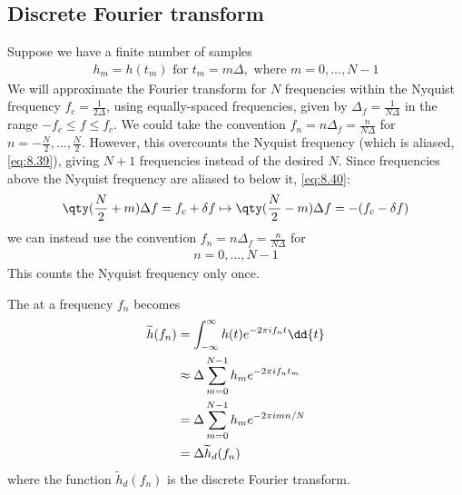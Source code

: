 \subsection{Discrete Fourier transform}
Suppose we have a finite number of samples
\begin{align} \label{eq:8.45}
	h_m = h(t_m) \text{ for } t_m = m \Delta, \text{ where } m = 0,\dots, N-1
\end{align}
We will approximate the Fourier transform for $N$ frequencies within the Nyquist frequency $f_c = \frac{1}{2\Delta}$, using equally-spaced frequencies, given by $\Delta_f = \frac{1}{N\Delta}$ in the range $-f_c \leq f \leq f_c$.
We could take the convention $f_n = n \Delta_f = \frac{n}{N\Delta}$ for $n = -\frac{N}{2}, \dots, \frac{N}{2}$.
However, this overcounts the Nyquist frequency (which is aliased, \cref{eq:8.39}), giving $N + 1$ frequencies instead of the desired $N$.
Since frequencies above the Nyquist frequency are aliased to below it, \cref{eq:8.40}:
\begin{align*}
	\qty(\frac{N}{2} + m) \Delta f = f_c + \delta f \mapsto \qty(\frac{N}{2} - m)\Delta f = -(f_c - \delta f)
\end{align*}
we can instead use the convention $f_n = n \Delta_f = \frac{n}{N\Delta}$ for
\begin{align} \label{eq:8.46}
	n = 0, \dots, N - 1
\end{align}
This counts the Nyquist frequency only once.

The  at a frequency $f_n$ becomes
\begin{align}
	\widetilde h(f_n) & = \int_{-\infty}^\infty h(t) e^{-2\pi if_n t} \dd{t} \notag \\
	& \approx \Delta \sum_{m=0}^{N-1} h_m e^{-2\pi i f_n t_m} \notag \\
	& = \Delta \sum_{m=0}^{N-1} h_m e^{-2\pi i m n / N} \notag \\
	& = \Delta \widetilde h_d(f_n) \label{eq:8.47}
\end{align}
where the function $\widetilde h_d(f_n)$ is the discrete Fourier transform.


